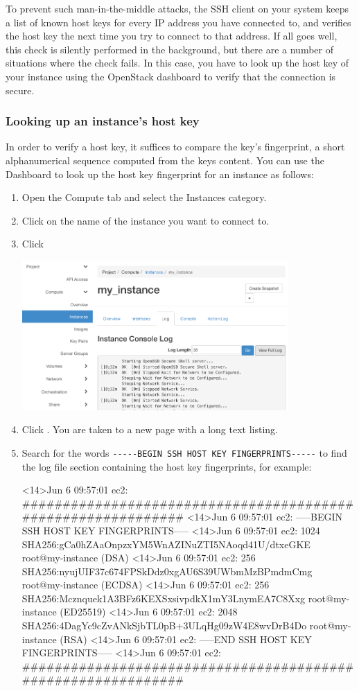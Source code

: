 To prevent such man-in-the-middle attacks, the SSH client on your
system keeps a list of known host keys for every IP address you have
connected to, and verifies the host key the next time you try to
connect to that address.  If all goes well, this check is silently
performed in the background, but there are a number of situations
where the check fails.  In this case, you have to look up the host key
of your instance using the OpenStack dashboard to verify that the
connection is secure.

\subsubsection*{Looking up an instance's host
  key}\label{sec:look-up-hostkey}
In order to verify a host key, it suffices to compare the key's
fingerprint, a short alphanumerical sequence computed from the keys
content.  You can use the Dashboard to look up the host key
fingerprint for an instance as follows:
\begin{enumerate}
\item Open the Compute tab and select the Instances category.
\item Click on the name of the instance you want to connect to.
\item Click 
  \begin{center}
    \includegraphics[width=0.8\textwidth]{img/instance_log}
  \end{center}

\item Click .  You are taken to a new page with a long text listing.
\item Search for the words \lstinline{-----BEGIN SSH HOST KEY FINGERPRINTS-----} to find the log file section containing the host key fingerprints, for example:
\begin{code}{}
<14>Jun  6 09:57:01 ec2: #############################################################
<14>Jun  6 09:57:01 ec2: -----BEGIN SSH HOST KEY FINGERPRINTS-----
<14>Jun  6 09:57:01 ec2: 1024 SHA256:gCa0hZAaOnpzxYM5WnAZINuZTI5NAoqd41U/dtxeGKE root@my-instance (DSA)
<14>Jun  6 09:57:01 ec2: 256 SHA256:nyujUIF37c674FPSkDdz0xgAU6S39UWbmMzBPmdmCmg root@my-instance (ECDSA)
<14>Jun  6 09:57:01 ec2: 256 SHA256:Mcznquek1A3BFz6KEXSxsivpdkX1mY3LnymEA7C8Xxg root@my-instance (ED25519)
<14>Jun  6 09:57:01 ec2: 2048 SHA256:4DagYc9cZvANkSjbTL0pB+3ULqHg09zW4E8wvDrB4Do root@my-instance (RSA)
<14>Jun  6 09:57:01 ec2: -----END SSH HOST KEY FINGERPRINTS-----
<14>Jun  6 09:57:01 ec2: #############################################################
\end{code}
\end{enumerate}

